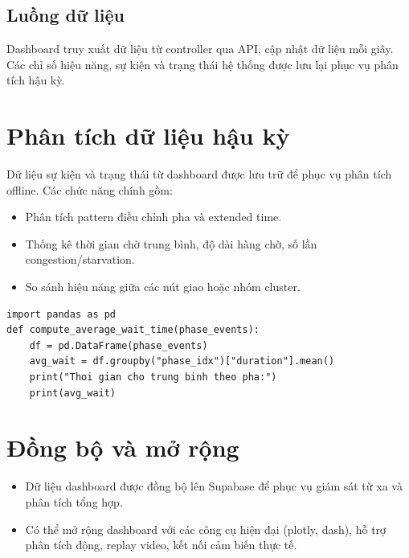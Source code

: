 \subsection{Luồng dữ liệu}
Dashboard truy xuất dữ liệu từ controller qua API, cập nhật dữ liệu mỗi giây. Các chỉ số hiệu năng, sự kiện và trạng thái hệ thống được lưu lại phục vụ phân tích hậu kỳ.

\section{Phân tích dữ liệu hậu kỳ}

Dữ liệu sự kiện và trạng thái từ dashboard được lưu trữ để phục vụ phân tích offline. Các chức năng chính gồm:
\begin{itemize}
    \item Phân tích pattern điều chỉnh pha và extended time.
    \item Thống kê thời gian chờ trung bình, độ dài hàng chờ, số lần congestion/starvation.
    \item So sánh hiệu năng giữa các nút giao hoặc nhóm cluster.
\end{itemize}

\begin{lstlisting}[style=py,caption={Ví dụ: Thống kê thời gian chờ trung bình}]
import pandas as pd
def compute_average_wait_time(phase_events):
    df = pd.DataFrame(phase_events)
    avg_wait = df.groupby("phase_idx")["duration"].mean()
    print("Thoi gian cho trung binh theo pha:")
    print(avg_wait)
\end{lstlisting}

\section{Đồng bộ và mở rộng}

\begin{itemize}
    \item Dữ liệu dashboard được đồng bộ lên Supabase để phục vụ giám sát từ xa và phân tích tổng hợp.
    \item Có thể mở rộng dashboard với các công cụ hiện đại (plotly, dash), hỗ trợ phân tích động, replay video, kết nối cảm biến thực tế.
\end{itemize}
